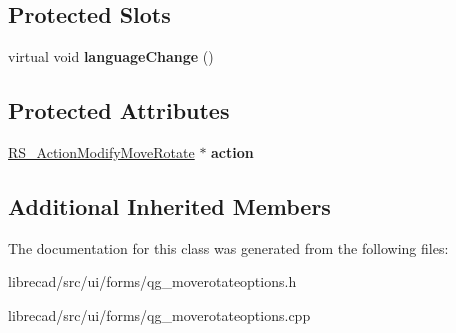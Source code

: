 \subsection*{Protected Slots}
\begin{DoxyCompactItemize}
\item 
\hypertarget{classQG__MoveRotateOptions_a631bad7f070c79b64b0d126fdaa191d3}{virtual void {\bfseries language\-Change} ()}\label{classQG__MoveRotateOptions_a631bad7f070c79b64b0d126fdaa191d3}

\end{DoxyCompactItemize}
\subsection*{Protected Attributes}
\begin{DoxyCompactItemize}
\item 
\hypertarget{classQG__MoveRotateOptions_a9be3817a06bb92f74d07df9fbb33e075}{\hyperlink{classRS__ActionModifyMoveRotate}{R\-S\-\_\-\-Action\-Modify\-Move\-Rotate} $\ast$ {\bfseries action}}\label{classQG__MoveRotateOptions_a9be3817a06bb92f74d07df9fbb33e075}

\end{DoxyCompactItemize}
\subsection*{Additional Inherited Members}


The documentation for this class was generated from the following files\-:\begin{DoxyCompactItemize}
\item 
librecad/src/ui/forms/qg\-\_\-moverotateoptions.\-h\item 
librecad/src/ui/forms/qg\-\_\-moverotateoptions.\-cpp\end{DoxyCompactItemize}
